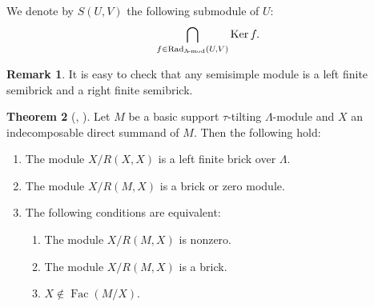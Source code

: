\documentclass[pdftex,a4paper]{article}
\numberwithin{equation}{subsection}
\theoremstyle{definition}
\newtheorem{theorem}{Theorem}[section]
\newtheorem{remark}[theorem]{Remark}
\newcommand{\lmod}{\operatorname{\mathrm{\hspace{-2pt}-mod}}}
\newcommand{\Kernel}{\operatorname{\mathrm{Ker}}}
\newcommand{\Rad}{{\operatorname{Rad}\nolimits}}
\newcommand{\Fac}{\operatorname{\mathrm{Fac}}}
\begin{document}
We denote by \(S(U,V)\) the following submodule of \(U\):
\begin{equation}
	\bigcap_{f\in \Rad_{\Lambda\lmod}(U,V)}\Kernel f.
\end{equation}
\begin{remark}\label{serre simple 2021-09-09 19:04:50}
	It is easy to check that any semisimple module is a left finite semibrick and a right finite semibrick.
\end{remark}
\begin{theorem}
	[{\cite[Lemma 2.5, Proposition 2.13]{MR4139031}, \cite[Theorem 4.1]{MR3910476}}]\label{2021-11-22 19:52:15}
	Let \(M\) be a basic support \(\tau\)-tilting \(\Lambda\)-module and \(X\) an indecomposable direct summand of \(M\).
	Then the following hold:
	\begin{enumerate}
		\item The module \(X/R(X,X)\) is a left finite brick over \(\Lambda\). %
		\item The module \(X/R(M,X)\) is a brick or zero module. %
		\item The following conditions are equivalent:
		      \begin{enumerate}
			      \item The module \(X/R(M,X)\) is nonzero.
			      \item The module \(X/R(M,X)\) is a brick.
			      \item \(X\notin \Fac(M/X)\).
		      \end{enumerate}
	\end{enumerate}
\end{theorem}
\end{document}
